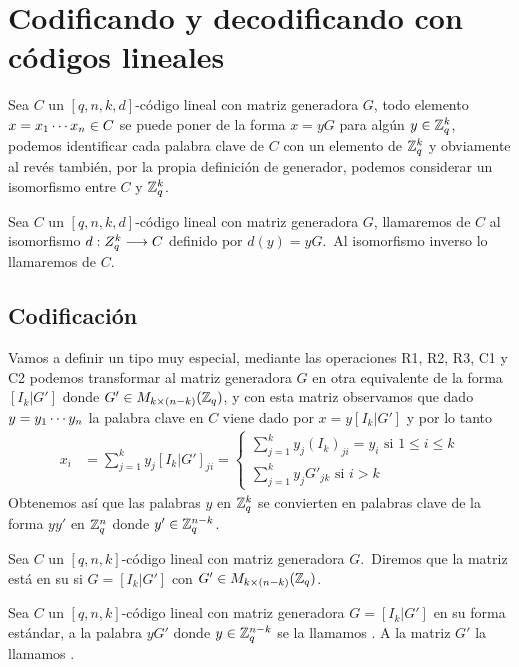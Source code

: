 \section{Codificando y decodificando con códigos lineales}
Sea $C$ un $[q, n, k, d]$-código lineal con matriz generadora $G$, todo elemento $x=x_1\cdots x_{n}\in C$ se puede poner de la forma $x=yG$ para algún $y\in\mathbb{Z}_q^k$, podemos identificar cada palabra clave de $C$ con un elemento de $\mathbb{Z}_q^k$ y obviamente al revés también, por la propia definición de generador, podemos considerar un isomorfismo entre $C$ y $\mathbb{Z}_q^k$.

\begin{definition}
	Sea $C$ un $[q, n, k, d]$-código lineal con matriz generadora $G$, llamaremos  de $C$ al isomorfismo $d:Z_q^k\longrightarrow C$ definido por $d(y)=yG$.\ Al isomorfismo inverso lo llamaremos  de $C$.
\end{definition}

\subsection{Codificación}
Vamos a definir un tipo muy especial, mediante las operaciones R1, R2, R3, C1 y C2 podemos transformar al matriz generadora $G$ en otra equivalente de la forma $[I_k|G']$ donde $G'\in M_{k\times (n-k)}(\mathbb{Z}_q)$, y con esta matriz observamos que dado $y=y_1\cdots y_{n}$ la palabra clave en $C$ viene dado por $x=y[I_k|G']$ y por lo tanto
\begin{align*}
	x_i &= \sum_{j=1}^k y_j [I_k|G']_{ji}=\begin{cases}
		                                     \sum\limits_{j=1}^k y_j (I_k)_{ji}=y_i \text{ si $1\leq i \leq k$} \\
		                                     \sum\limits_{j=1}^k y_j G'_{jk} \text{ si $i > k$}
	\end{cases}
\end{align*}
Obtenemos así que las palabras $y$ en $\mathbb{Z}_q^k$ se convierten en palabras clave de la forma $yy'$ en $\mathbb{Z}_q^n$ donde $y'\in\mathbb{Z}_q^{n-k}$.

\begin{definition}
	Sea $C$ un $[q, n, k]$-código lineal con matriz generadora $G$.\ Diremos que la matriz está en su  si $G=[I_k|G']$ con $G'\in M_{k\times (n-k)}(\mathbb{Z}_q)$.
\end{definition}

\begin{definition}
	Sea $C$ un $[q, n, k]$-código lineal con matriz generadora $G=[I_k|G']$ en su forma estándar, a la palabra $yG'$ donde $y\in \mathbb{Z}_q^{n-k}$ se la llamamos .
	A la matriz $G'$ la llamamos .
\end{definition}

